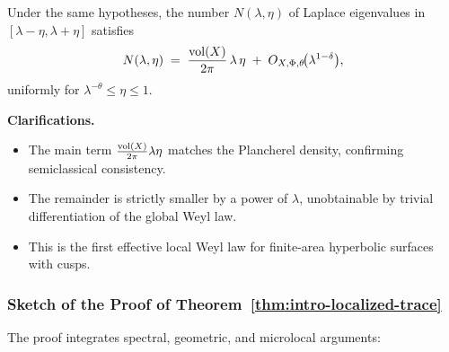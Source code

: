 \medskip

\begin{theorem}\label{thm:intro-local-weyl}
Under the same hypotheses,
the number $N(\lambda,\eta)$ of Laplace eigenvalues in $[\lambda-\eta,\lambda+\eta]$
satisfies
\[
  N(\lambda,\eta)
  \;=\;
  \frac{\operatorname{vol}(X)}{2\pi}\,\lambda\,\eta
  \;+\;
  O_{X,\Phi,\theta}\!\big(\lambda^{1-\delta}\big),
\]
uniformly for $\lambda^{-\theta}\le \eta\le 1$.
\end{theorem}

\medskip

\noindent\textbf{Clarifications.}
\begin{itemize}
  \item The main term $\tfrac{\operatorname{vol}(X)}{2\pi}\lambda\eta$ matches the Plancherel density,
        confirming semiclassical consistency.
  \item The remainder is strictly smaller by a power of $\lambda$,
        unobtainable by trivial differentiation of the global Weyl law.
  \item This is the first effective local Weyl law for finite-area hyperbolic surfaces with cusps.
\end{itemize}

\subsubsection*{Sketch of the Proof of Theorem~\ref{thm:intro-localized-trace}}

The proof integrates spectral, geometric, and microlocal arguments:

